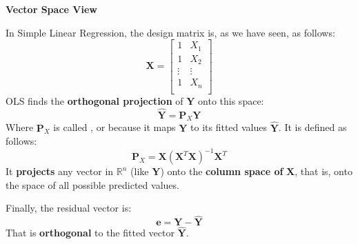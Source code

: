 \begin{flushleft}
    \textcolor{Green3}{ \textbf{Vector Space View}}
\end{flushleft}
In Simple Linear Regression, the design matrix is, as we have seen, as follows:
\begin{equation*}
    \mathbf{X} =
    \begin{bmatrix}
        1 & X_{1} \\
        1 & X_{2} \\
        \vdots & \vdots \\
        1 & X_{n} \\
    \end{bmatrix}
\end{equation*}
OLS finds the \textbf{orthogonal projection} of $\mathbf{Y}$ onto this space:
\begin{equation}
    \hat{\mathbf{Y}} = \mathbf{P}_X \mathbf{Y}
\end{equation}
Where $\mathbf{P}_X$ is called , or  because it maps $\mathbf{Y}$ to its fitted values $\hat{\mathbf{Y}}$. It is defined as follows:
\begin{equation}\label{eq: Projection Matrix}
    \mathbf{P}_X = \mathbf{X}\left(\mathbf{X}^{T} \mathbf{X}\right)^{-1} \mathbf{X}^{T}
\end{equation}
It \textbf{projects} any vector in $\mathbb{R}^{n}$ (like $\mathbf{Y}$) onto the \textbf{column space of} $\mathbf{X}$, that is, onto the space of all possible predicted values. 

\highspace
Finally, the residual vector is:
\begin{equation}
    \mathbf{e} = \mathbf{Y} - \hat{\mathbf{Y}}
\end{equation}
That is \textbf{orthogonal} to the fitted vector $\hat{\mathbf{Y}}$.